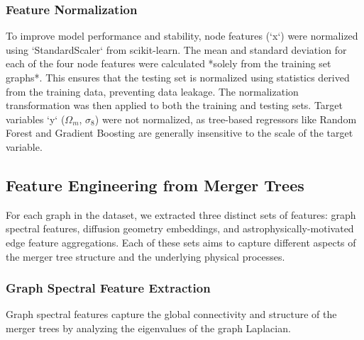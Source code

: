 \documentclass[twocolumn]{aastex631}
\begin{document}
\subsubsection{Feature Normalization}
To improve model performance and stability, node features (`x`) were normalized using `StandardScaler` from scikit-learn. The mean and standard deviation for each of the four node features were calculated *solely from the training set graphs*. This ensures that the testing set is normalized using statistics derived from the training data, preventing data leakage. The normalization transformation was then applied to both the training and testing sets. Target variables `y` ($\Omega_m$, $\sigma_8$) were not normalized, as tree-based regressors like Random Forest and Gradient Boosting are generally insensitive to the scale of the target variable.

\subsection{Feature Engineering from Merger Trees}

For each graph in the dataset, we extracted three distinct sets of features: graph spectral features, diffusion geometry embeddings, and astrophysically-motivated edge feature aggregations. Each of these sets aims to capture different aspects of the merger tree structure and the underlying physical processes.

\subsubsection{Graph Spectral Feature Extraction}
Graph spectral features capture the global connectivity and structure of the merger trees by analyzing the eigenvalues of the graph Laplacian.
\end{document}
